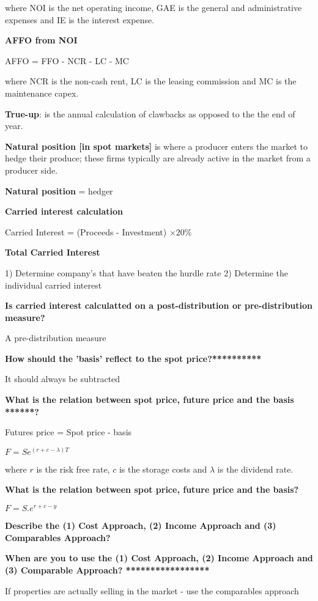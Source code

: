 \documentclass[12pt]{article}
\begin{document}
\begin{framed}
where NOI is the net operating income, GAE is the general and administrative expenses and IE is the interest expense.


\textbf{AFFO from NOI}

AFFO = FFO - NCR - LC - MC

where NCR is the non-cash rent, LC is the leasing commission and MC is the maintenance capex.


\textbf{True-up}: is the annual calculation of clawbacks as opposed to the the end of year. 

\textbf{Natural position [in spot markets]} is where a producer enters the market to hedge their produce; these firms typically are already active in the market from a producer side.

\textbf{Natural position} = hedger

\textbf{Carried interest calculation}

Carried Interest = (Proceeds - Investment) $\times 20\%$

\textbf{Total Carried Interest}

1) Determine company's that have beaten the hurdle rate
2) Determine the individual carried interest

\textbf{Is carried interest calculatted on a post-distribution or pre-distribution measure?}

A pre-distribution measure


\textbf{How should the 'basis' reflect to the spot price?**********}

It should always be subtracted

\textbf{What is the relation between spot price, future price and the basis ******?}

Futures price = Spot price - basis 

$F = S e^{(r + c - \lambda)T}$

where $r$ is the risk free rate, $c$ is the storage costs and $\lambda$ is the dividend rate.

\textbf{What is the relation between spot price, future price and the basis?}

$F = S . e^{r + c - y}$

\textbf{Describe the (1) Cost Approach, (2) Income Approach and (3) Comparables Approach?}

\textbf{When are you to use the (1) Cost Approach, (2) Income Approach and (3) Comparable Approach?  *****************}

If properties are actually selling in the market - use the comparables approach


\end{framed}
\end{document}
